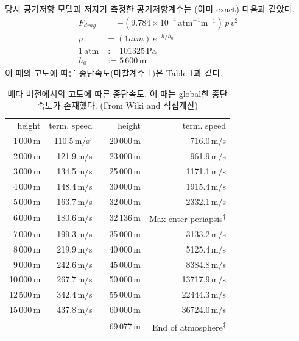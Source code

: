 \documentclass[9pt,twoside,openany]{amsbook}
\newcommand{\ttuna}{\textsuperscript{$\dagger$}} %
\newcommand{\ttsecu}{\textsuperscript{$\ddagger$}} %
\begin{document}
당시 공기저항 모델과 저자가 측정한 공기저항계수는 (아마 exact) 다음과 같았다.
\begin{align}
F_{drag}&=-(9.784\times 10^{-4}\, \mathrm{atm}^{-1}\mathrm{m}^{-1})\, p\, v^2
\\p&=(1 atm)\,e^{-h/h_0}
\\1\,\mathrm{atm} &:= 101325\,\mathrm{Pa}
\\h_0&:= 5\,600\,\mathrm{m}
\end{align}
이 때의 고도에 따른 종단속도(마찰계수 1)은 Table \ref{table:obslete}과 같다.
\begin{table}
\begin{center}
\begin{threeparttable}
	\caption{베타 버전에서의 고도에 따른 종단속도. 이 때는 global한 종단속도가 존재했다.
	 (From Wiki and 직접계산)}\label{table:obslete}
		\begin{tabular}{|r|r|r|r|r|}
			\cline{1-2}\cline{4-5}
			height& term. speed&&height& term. speed
			\\\cline{1-2}\cline{4-5}
			1\,000\,m&110.5\,m/s$^\flat$ && 20\,000\,m&716.0\,m/s
			\\\cline{1-2}\cline{4-5}
			2\,000\,m&121.9\,m/s && 23\,000\,{m}&961.9\,m/s
			\\\cline{1-2}\cline{4-5}
			3\,000\,m&134.5\,m/s && 25\,000\,{m}&1171.1\,m/s
			\\\cline{1-2}\cline{4-5}
			4\,000\,m&148.4\,m/s && 30\,000\,{m}&1915.4\,m/s
			\\\cline{1-2}\cline{4-5}
			5\,000\,m&163.7\,m/s && 32\,000\,{m}&2332.1\,m/s
			\\\cline{1-2}\cline{4-5}
			6\,000\,{m}&180.6\,m/s && 32\,136\,{m}&Max enter periapsis\ttuna
			\\\cline{1-2}\cline{4-5}
			7\,000\,{m}&199.3\,m/s && 35\,000\,{m}&3133.2\,m/s
			\\\cline{1-2}\cline{4-5}
			8\,000\,{m}&219.9\,m/s && 40\,000\,{m}&5125.4\,m/s
			\\\cline{1-2}\cline{4-5}
			9\,000\,{m}&242.6\,m/s && 45\,000\,{m}&8384.8\,m/s
			\\\cline{1-2}\cline{4-5}
			10\,000\,{m}&267.7\,m/s && 50\,000\,{m}&13717.9\,m/s
			\\\cline{1-2}\cline{4-5}
			12\,500\,{m}&342.4\,m/s && 55\,000\,{m}&22444.3\,m/s
			\\\cline{1-2}\cline{4-5}
			15\,000\,{m}&437.8\,m/s && 60\,000\,{m}&36724.0\,m/s
			\\\cline{1-2}\cline{4-5}
			\multicolumn{3}{r|}{}&69\,077\,{m}&End of atmosphere\ttsecu

\end{tabular}
\end{threeparttable}
\end{center}
\end{table}
\end{document}
